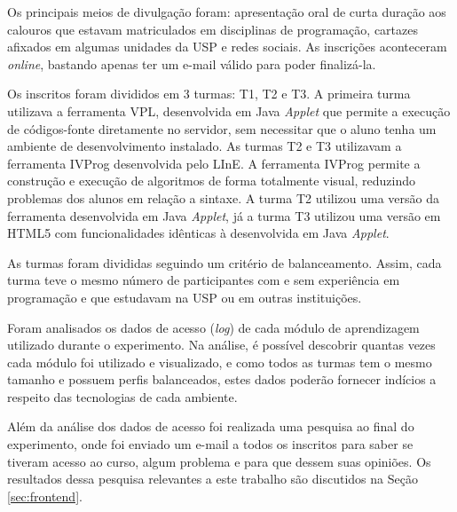 Os principais meios de divulgação foram: apresentação oral de curta duração aos calouros que estavam matriculados em disciplinas de programação, cartazes afixados em algumas unidades da USP e redes sociais. As inscrições aconteceram \emph{online}, bastando apenas ter um e-mail válido para poder finalizá-la.

Os inscritos foram divididos em 3 turmas: T1, T2 e T3. A primeira turma utilizava a ferramenta VPL, desenvolvida em Java \emph{Applet} que permite a execução de códigos-fonte diretamente no servidor, sem necessitar que o aluno tenha um ambiente de desenvolvimento instalado. As turmas T2 e T3 utilizavam a ferramenta IVProg desenvolvida pelo LInE. A ferramenta IVProg permite a construção e execução de algoritmos de forma totalmente visual, reduzindo problemas dos alunos em relação a sintaxe. A turma T2 utilizou uma versão da ferramenta desenvolvida em Java \emph{Applet}, já a turma T3 utilizou uma versão em HTML5 com funcionalidades idênticas à desenvolvida em Java \emph{Applet}.

As turmas foram divididas seguindo um critério de balanceamento. Assim, cada turma teve o mesmo número de participantes com e sem experiência em programação e que estudavam na USP ou em outras instituições.

Foram analisados os dados de acesso (\emph{log}) de cada módulo de aprendizagem utilizado durante o experimento. Na análise, é possível descobrir quantas vezes cada módulo foi utilizado e visualizado, e como todos as turmas tem o mesmo tamanho e possuem perfis balanceados, estes dados poderão fornecer indícios a respeito das tecnologias de cada ambiente.

Além da análise dos dados de acesso foi realizada uma pesquisa ao final do experimento, onde foi enviado um e-mail a todos os inscritos para saber se tiveram acesso ao curso, algum problema e para que dessem suas opiniões. Os resultados dessa pesquisa relevantes a este trabalho são discutidos na Seção \ref{sec:frontend}.




